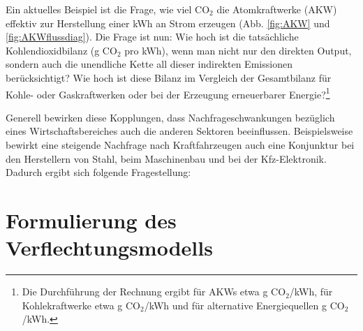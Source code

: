 Ein aktuelles
Beispiel ist die Frage, wie viel CO$_2$ die Atomkraftwerke (AKW) effektiv
zur Herstellung einer kWh an Strom erzeugen (Abb. \ref{fig:AKW} und \ref{fig:AKWflussdiag}).
Die Frage ist nun: Wie hoch ist die  tats\"achliche Kohlendioxidbilanz
(g CO$_2$ pro kWh), wenn man nicht nur den direkten Output, sondern
auch die unendliche Kette all dieser indirekten Emissionen
ber\"ucksichtigt? Wie hoch ist diese Bilanz im Vergleich der Gesamtbilanz f\"ur 
Kohle- oder Gaskraftwerken oder bei der Erzeugung erneuerbarer
Energie?\footnote{Die Durchf\"uhrung der Rechnung ergibt f\"ur AKWs
etwa \unit[40]{g} CO$_2$/kWh, f\"ur Kohlekraftwerke etwa 
\unit[800]{g} CO$_2$/kWh und
f\"ur alternative Energiequellen \unit[50-100]{g} CO$_2$/kWh.}

Generell bewirken diese Kopplungen, dass Nachfrageschwankungen
bez\"uglich eines Wirtschaftsbereiches auch die anderen Sektoren
beeinflussen. Beispielsweise bewirkt eine steigende Nachfrage nach
Kraftfahrzeugen auch eine Konjunktur bei den Herstellern von Stahl,
beim Maschinenbau und bei der Kfz-Elektronik. Dadurch ergibt sich
folgende  Fragestellung:




\section{\label{sec:IOMdef}Formulierung des Verflechtungsmodells}

